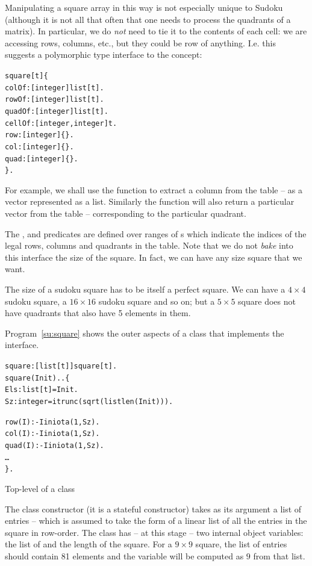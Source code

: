 Manipulating a square array in this way is not especially unique to Sudoku (although it is not all that often that one needs to process the quadrants of a matrix). In particular, we do \emph{not} need to tie it to the contents of each cell: we are accessing rows, columns, etc., but they could be row of anything. I.e. this suggests a polymorphic type interface to the  concept:
\begin{alltt}
square[t] \typearrow{} \{ 
  colOf:[integer]\funarrow{}list[t]. 
  rowOf:[integer]\funarrow{}list[t].
  quadOf:[integer]\funarrow{}list[t].
  cellOf:[integer,integer]\funarrow{}t.
  row:[integer]\{\}.
  col:[integer]\{\}.
  quad:[integer]\{\}.
\}.
\end{alltt}
For example, we shall use the  function to extract a column from the table -- as a vector represented as a list. Similarly the  function will also return a particular vector from the table -- corresponding to the particular quadrant.

The ,  and  predicates are defined over ranges of s which indicate the indices of the legal rows, columns and quadrants in the table. Note that we do not \emph{bake} into this interface the size of the square. In fact, we can have any size square that we want.
\begin{aside}
The size of a sudoku square has to be itself a perfect square. We can have a $4\times{}4$ sudoku square, a $16\times{}16$ sudoku square and so on; but a $5\times{}5$ square does not have quadrants that also have 5 elements in them.
\end{aside}
Program~\vref{su:square} shows the outer aspects of a class that implements the  interface.
\begin{program}
\vspace{0.5ex}
\begin{alltt}
square:[list[t]]\sconarrow{}square[t].
square(Init)..\{
  Els:list[t] = Init.
  Sz:integer = itrunc(sqrt(listlen(Init))).

  row(I) :- I in iota(1,Sz).
  col(I) :- I in iota(1,Sz).
  quad(I) :- I in iota(1,Sz).
  \ldots{}
\}.
\end{alltt}
\vspace{-2ex}
\caption{Top-level of a  class}
\label{su:square}
\end{program}
The  class constructor (it is a stateful constructor) takes as its argument a list of entries -- which is assumed to take the form of a linear list of all the entries in the square in row-order. The class has -- at this stage -- two internal object variables: the list of  and the length of the square. For a $9\times{}9$ square, the list of entries should contain 81 elements and the variable  will be computed as $9$ from that list.

